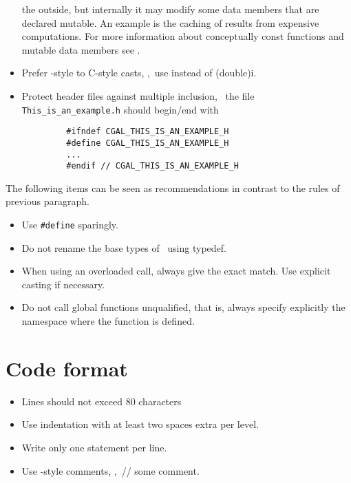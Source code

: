 \begin{itemize}
      the outside, but internally it may modify some data members
      that are declared {\ccFont mutable}. An example
      is the caching of results from expensive computations.  For more
      information about conceptually {\ccFont const} functions and mutable data
      members see \cite{cgal:m-ec-97}.
\item Prefer \CC-style to C-style casts,%
      \eg,~use  instead of {\ccFont (double)i}.
\item Protect header files against multiple inclusion,
      \eg~the file {\tt This\_is\_an\_example.h} should begin/end with
      \begin{verbatim}
         #ifndef CGAL_THIS_IS_AN_EXAMPLE_H
         #define CGAL_THIS_IS_AN_EXAMPLE_H
         ...
         #endif // CGAL_THIS_IS_AN_EXAMPLE_H
     \end{verbatim}
\end{itemize}

The following items can be seen as recommendations
in contrast to the rules of previous paragraph.

\begin{itemize}
\item Use \verb|#define| sparingly.
\item Do not rename the base types of \CC\ using {\ccFont typedef}.
\item When using an overloaded call, always give the exact match. Use
  explicit casting if necessary.
\item Do not call global functions unqualified, that is, always
  specify explicitly the namespace where the function is defined.
\end{itemize}


\section{Code format\label{sec:code_format}}

\begin{itemize}
\item Lines should not exceed 80 characters
\item Use indentation with at least two spaces extra per level.%
\item Write only one statement per line.
\item Use \CC-style comments, \eg,~{\ccFont // some comment}.%
\end{itemize}


